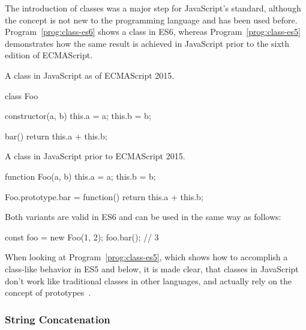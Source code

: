 The introduction of classes was a major step for JavaScript's standard, although the concept is not new to the programming language and has been used before. Program~\ref{prog:class-es6} shows a class in ES6, whereas Program~\ref{prog:class-es5} demonstrates how the same result is achieved in JavaScript prior to the sixth edition of ECMAScript.
\begin{program}
\caption{A class in JavaScript as of ECMAScript 2015.}
\label{prog:class-es6}
\begin{JsCode}
class Foo {
  
  constructor(a, b) {
    this.a = a;
    this.b = b;
  } 
  
  bar() {
    return this.a + this.b;
  }
  
}
\end{JsCode}
\end{program}
\begin{program}
\caption{A class in JavaScript prior to ECMAScript 2015.}
\label{prog:class-es5}
\begin{JsCode}
function Foo(a, b) {
  this.a = a;
  this.b = b;
}

Foo.prototype.bar = function() {
  return this.a + this.b;
}
\end{JsCode}
\end{program}
Both variants are valid in ES6 and can be used in the same way as follows:
\begin{JsCode}[numbers=none]
const foo = new Foo(1, 2);
foo.bar(); // 3
\end{JsCode}
When looking at Program~\ref{prog:class-es5}, which shows how to accomplish a class-like behavior in ES5 and below, it is made clear, that classes in JavaScript don't work like traditional classes in other languages, and actually rely on the concept of prototypes~\cite[p.~135]{YDKJS:ES6AndBeyond:Simpson:2015}.

\subsubsection{String Concatenation}

